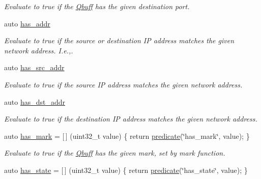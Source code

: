 \begin{DoxyCompactItemize}
\begin{DoxyCompactList}\small\item\em Evaluate to {\ttfamily true} if the \hyperlink{structpfq_1_1lang_1_1Qbuff}{Qbuff} has the given destination port. \end{DoxyCompactList}\item 
auto \hyperlink{namespacepfq_1_1lang_1_1anonymous__namespace_02default_8hpp_03_a74c6b7e812fb3d312ebf534960a6a91d}{has\+\_\+addr}
\begin{DoxyCompactList}\small\item\em Evaluate to {\ttfamily true} if the source or destination IP address matches the given network address. I.\+e.,. \end{DoxyCompactList}\item 
auto \hyperlink{namespacepfq_1_1lang_1_1anonymous__namespace_02default_8hpp_03_acb03dd3e34d6dd7e83d621fa9077194c}{has\+\_\+src\+\_\+addr}
\begin{DoxyCompactList}\small\item\em Evaluate to {\ttfamily true} if the source IP address matches the given network address. \end{DoxyCompactList}\item 
auto \hyperlink{namespacepfq_1_1lang_1_1anonymous__namespace_02default_8hpp_03_a0a53822af0ed8ea341f16a1da5ea83e3}{has\+\_\+dst\+\_\+addr}
\begin{DoxyCompactList}\small\item\em Evaluate to {\ttfamily true} if the destination IP address matches the given network address. \end{DoxyCompactList}\item 
auto \hyperlink{namespacepfq_1_1lang_1_1anonymous__namespace_02default_8hpp_03_aa4ce1fdb0d99e1ca0afdf76619c58d12}{has\+\_\+mark} = \mbox{[}$\,$\mbox{]} (uint32\+\_\+t value) \{ return \hyperlink{namespacepfq_1_1lang_aca9adafc436b7f851621b979fa1aaf88}{predicate}(\char`\"{}has\+\_\+mark\char`\"{}, value); \}
\begin{DoxyCompactList}\small\item\em Evaluate to {\ttfamily true} if the \hyperlink{structpfq_1_1lang_1_1Qbuff}{Qbuff} has the given {\ttfamily mark}, set by mark function. \end{DoxyCompactList}\item 
auto \hyperlink{namespacepfq_1_1lang_1_1anonymous__namespace_02default_8hpp_03_a8efacc41a17e01f17a25e8fc1d784c74}{has\+\_\+state} = \mbox{[}$\,$\mbox{]} (uint32\+\_\+t value) \{ return \hyperlink{namespacepfq_1_1lang_aca9adafc436b7f851621b979fa1aaf88}{predicate}(\char`\"{}has\+\_\+state\char`\"{}, value); \}

\end{DoxyCompactItemize}
